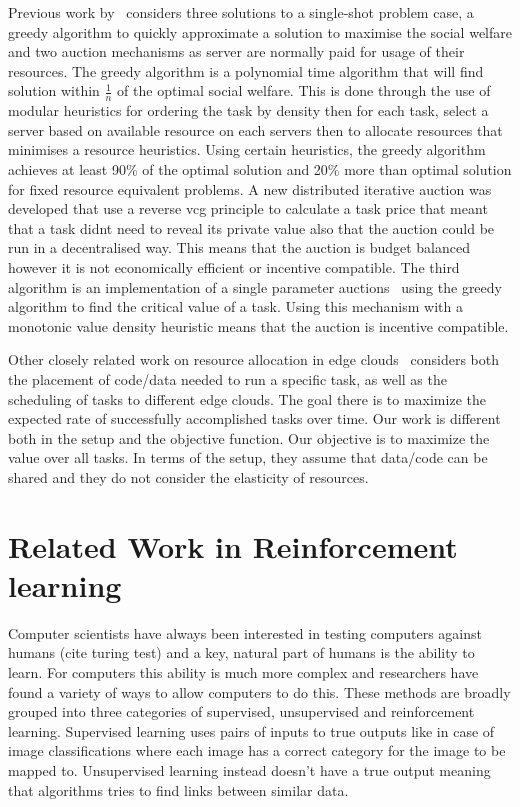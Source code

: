 Previous work by~\cite{FlexibleResourceAllocation} considers three solutions to a single-shot problem case,
a greedy algorithm to quickly approximate a solution to maximise the social welfare and two auction mechanisms as server
are normally paid for usage of their resources. The greedy algorithm is a polynomial time algorithm that will find solution
within $\frac{1}{n}$ of the optimal social welfare.
This is done through the use of modular heuristics for ordering the task by density then for each task, select a server
based on available resource on each servers then to allocate resources that minimises a resource heuristics.
Using certain heuristics, the greedy algorithm achieves at least 90\% of the optimal solution and 20\% more than optimal
solution for fixed resource equivalent problems. A new distributed iterative auction was developed that use a reverse vcg
principle to calculate a task price that meant that a task didnt need to reveal its private value also that the
auction could be run in a decentralised way. This means that the auction is budget balanced however it is not
economically efficient or incentive compatible. The third algorithm is an implementation of a single parameter
auctions~\citep{nisan2007algorithmic_critical_value} using the greedy algorithm to find the critical value of a task.
Using this mechanism with a monotonic value density heuristic means that the auction is incentive compatible.

Other closely related work on resource allocation in edge clouds~\cite{vaji_infocom} considers both the placement of
code/data needed to run a specific task, as well as the scheduling of tasks to different edge clouds. The goal there
is to maximize the expected rate of successfully accomplished tasks over time. Our work is different both in the setup
and the objective function. Our objective is to maximize the value over all tasks. In terms of the setup, they assume
that data/code can be shared and they do not consider the elasticity of resources.

\section{Related Work in Reinforcement learning}\label{sec:related-work-in-machine-learning}
Computer scientists have always been interested in testing computers against humans (cite turing test) and a key,
natural part of humans is the ability to learn. For computers this ability is much more complex and researchers have
found a variety of ways to allow computers to do this. These methods are broadly grouped into three categories of
supervised, unsupervised and reinforcement learning. Supervised learning uses pairs of inputs to true outputs like in
case of image classifications where each image has a correct category for the image to be mapped to. Unsupervised
learning instead doesn't have a true output meaning that algorithms tries to find links between similar data.

